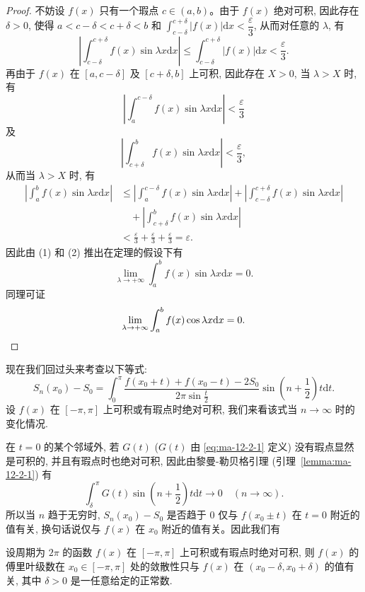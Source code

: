 \begin{proof}
不妨设 $f(x)$ 只有一个瑕点 $c\in(a,b)$。由于 $f(x)$ 绝对可积, 因此存在 $\delta>0$, 使得 $a<c-\delta<c+\delta<b$ 和 $\int_{c-\delta}^{c+\delta}|f(x)|\mathrm dx<\dfrac{\varepsilon}{3}$, 从而对任意的 $\lambda$, 有
\[
  \left|\int_{c-\delta}^{c+\delta}f(x)\sin\lambda x\mathrm dx\right|
  \leqslant\int_{c-\delta}^{c+\delta}|f(x)|\mathrm dx<\frac{\varepsilon}{3}.
\]
再由于 $f(x)$ 在 $[a,c-\delta]$ 及 $[c+\delta,b]$ 上可积, 因此存在 $X>0$, 当 $\lambda>X$ 时, 有
\[
  \left|\int_a^{c-\delta}f(x)\sin\lambda x\mathrm dx\right|<\frac{\varepsilon}{3}
\]
及
\[
  \left|\int_{c+\delta}^b f(x)\sin\lambda x\mathrm dx\right|<\frac{\varepsilon}{3},
\]
从而当 $\lambda>X$ 时, 有
\[
\begin{aligned}
  \left|\int_a^b f(x)\sin\lambda x\mathrm dx\right|
  &\leqslant\left|\int_a^{c-\delta}f(x)\sin\lambda x\mathrm dx\right|
    +\left|\int_{c-\delta}^{c+\delta}f(x)\sin\lambda x\mathrm dx\right|\\
  &\quad+\left|\int_{c+\delta}^b f(x)\sin\lambda x\mathrm dx\right|\\
  &<\frac{\varepsilon}{3}+\frac{\varepsilon}{3}+\frac{\varepsilon}{3}=\varepsilon.
\end{aligned}
\]
因此由 (1) 和 (2) 推出在定理的假设下有
\[
  \lim_{\lambda\to+\infty}\int_a^b f(x)\sin\lambda x\mathrm dx=0.
\]
同理可证
\[
  \lim_{\lambda\to+\infty}\int_a^b f(x)\cos\lambda x\mathrm dx=0.
\qedhere
\]
\end{proof}


现在我们回过头来考查以下等式:
\[
  S_n(x_0)-S_0
  =\int_0^\pi\frac{f(x_0+t)+f(x_0-t)-2S_0}{2\pi\sin\frac t2}
    \sin\left(n+\frac12\right)t\mathrm dt.
\]
设 $f(x)$ 在 $[-\pi,\pi]$ 上可积或有瑕点时绝对可积, 我们来看该式当 $n\to\infty$ 时的变化情况.

在 $t=0$ 的某个邻域外, 若 $G(t)$ ($G(t)$ 由 \eqref{eq:ma-12-2-1} 定义) 没有瑕点显然是可积的, 并且有瑕点时也绝对可积, 因此由黎曼-勒贝格引理 (引理~\ref{lemma:ma-12-2-1}) 有
\[
  \int_\delta^\pi G(t)\sin\left(n+\frac12\right)t\mathrm dt\to0
  \quad (n\to\infty).
\]
所以当 $n$ 趋于无穷时, $S_n(x_0)-S_0$ 是否趋于 $0$ 仅与 $f(x_0\pm t)$ 在 $t=0$ 附近的值有关, 换句话说仅与 $f(x)$ 在 $x_0$ 附近的值有关。因此我们有

\begin{theorem}[{黎曼局部化定理}]\label{theorem:ma-12-2-2}
设周期为 $2\pi$ 的函数 $f(x)$ 在 $[-\pi,\pi]$ 上可积或有瑕点时绝对可积, 则 $f(x)$ 的傅里叶级数在 $x_0\in[-\pi,\pi]$ 处的敛散性只与 $f(x)$ 在 $(x_0-\delta,x_0+\delta)$ 的值有关, 其中 $\delta>0$ 是一任意给定的正常数.
\end{theorem}

